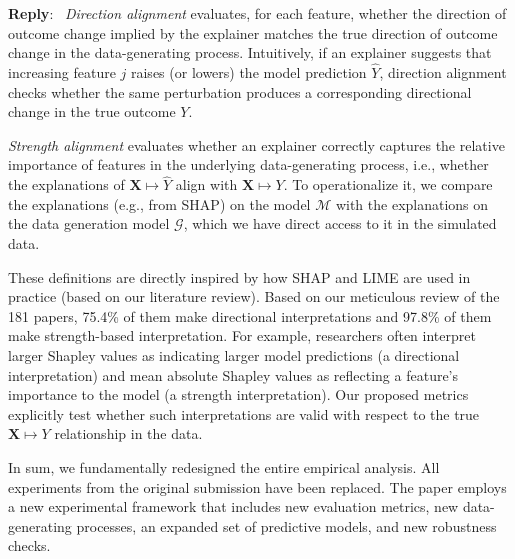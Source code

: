 \documentclass[11pt]{article}
\newcounter{se}[section]
\newenvironment{reply}
 {\par\medskip \noindent \begin{sf}\textbf{Reply}:\ }
 {\medskip \end{sf}}
\begin{document}
\begin{reply}
\emph{Direction alignment} evaluates, for each feature, whether the direction of outcome change implied by the explainer matches the true direction of outcome change in the data-generating process. Intuitively, if an explainer suggests that increasing feature $j$ raises (or lowers) the model prediction $\hat{Y}$, direction alignment checks whether the same perturbation produces a corresponding directional change in the true outcome $Y$.

\emph{Strength alignment} evaluates whether an explainer correctly captures the relative importance of features in the underlying data-generating process, i.e., whether the explanations of $\mathbf{X} \mapsto \hat{Y}$ align with $\mathbf{X} \mapsto Y$.  To operationalize it, we compare the explanations (e.g., from SHAP) on the model $\mathcal{M}$ with the explanations on the data generation model $\mathcal{G}$, which we have direct access to it in the simulated data.


These definitions are directly inspired by how SHAP and LIME are used in practice (based on our literature review).  Based on our meticulous review of the 181 papers, 75.4\% of them make directional interpretations and 97.8\% of them make strength-based interpretation. For example, researchers often interpret larger Shapley values as indicating larger model predictions (a directional interpretation) and mean absolute Shapley values as reflecting a feature’s importance to the model (a strength interpretation). Our proposed metrics explicitly test whether such interpretations are valid with respect to the true $\mathbf{X} \mapsto Y$ relationship in the data. 


In sum, we fundamentally redesigned the entire empirical analysis. All experiments from the original submission have been replaced. The paper employs a new experimental framework that includes new evaluation metrics, new data-generating processes, an expanded set of predictive models, and new robustness checks. 
\end{reply}
\end{document}
